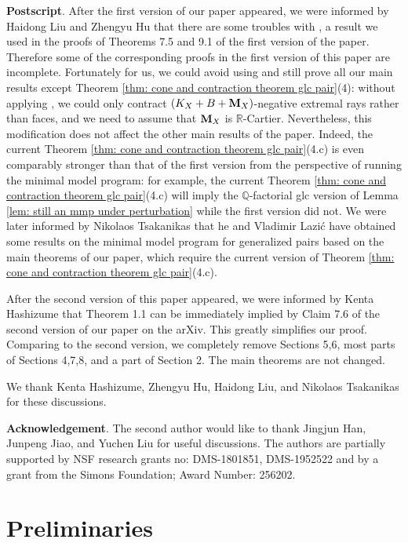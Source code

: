 \documentclass[11pt]{amsart}
\numberwithin{equation}{section}
\newcommand{\Mm}{{\bf{M}}}
\newcommand{\Qq}{\mathbb{Q}}
\newcommand{\Rr}{\mathbb{R}}
\theoremstyle{definition}
\theoremstyle{definition}
\theoremstyle{definition}
\begin{document}
\noindent\textbf{Postscript}. After the first version of our paper appeared, we were informed by Haidong Liu and Zhengyu Hu that there are some troubles with \cite[Theorem 1.9]{Hu21}, a result we used in the proofs of Theorems 7.5 and 9.1 of the first version of the paper. Therefore some of the corresponding  proofs in the first version of this paper are incomplete. Fortunately for us, we could avoid using \cite{Hu21} and still prove all our main results except Theorem \ref{thm: cone and contraction theorem glc pair}(4): without applying \cite{Hu21}, we could only contract $(K_X+B+\Mm_X)$-negative extremal rays rather than faces, and we need to assume that $\Mm_X$ is $\Rr$-Cartier. Nevertheless, this modification does not affect the other main results of the paper. Indeed, the current Theorem \ref{thm: cone and contraction theorem glc pair}(4.c) is even comparably stronger than that of the first version from the perspective of running the minimal model program: for example, the current Theorem \ref{thm: cone and contraction theorem glc pair}(4.c) will imply the $\Qq$-factorial glc version of Lemma \ref{lem: still an mmp under perturbation} while the first version did not. We were later informed by Nikolaos Tsakanikas that he and Vladimir Lazi\'c have obtained some results on the minimal model program for generalized pairs \cite{LT21} based on the main theorems of our paper, which require the current version of Theorem \ref{thm: cone and contraction theorem glc pair}(4.c).

After the second version of this paper  appeared,  we  were  informed  by  Kenta Hashizume that Theorem 1.1 can be immediately implied by Claim 7.6 of the second version of our paper on the arXiv.  This greatly simplifies our proof.  Comparing to the second version, we completely remove Sections 5,6, most parts of Sections 4,7,8, and a part of Section 2.  The main theorems are not changed.

We thank Kenta Hashizume, Zhengyu Hu, Haidong Liu, and Nikolaos Tsakanikas for these discussions.

\medskip

\noindent\textbf{Acknowledgement}.  The second author would like to thank Jingjun Han, Junpeng Jiao, and Yuchen Liu for useful discussions. The authors are partially supported by NSF research grants no: DMS-1801851, DMS-1952522 and by a grant from the Simons Foundation; Award Number: 256202.

\section{Preliminaries}
\end{document}
